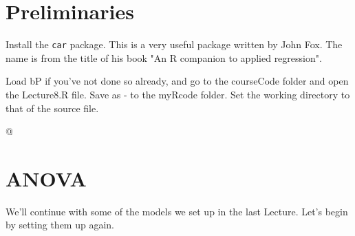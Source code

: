 \documentclass[titlepage]{book}\usepackage{knitr}
\begin{document}
\author{Brian Williams $<$\href{mailto:bjw649@gmail.com}%
{bjw649@gmail.com}$>$}


\section{Preliminaries}
Install the \texttt{car} package. This is a very useful package written by John Fox. The name is from the title of his book "An R companion to applied regression". 


Load bP if you've not done so already, and go to the courseCode folder and open the Lecture8.R file.  Save as - to the myRcode folder.  Set the working directory to that of the source file.

\begin{knitrout}
\color{fgcolor}\begin{kframe}
\begin{alltt}
\hlstd{(}\hlstd{)}
\end{alltt}
\end{kframe}
\end{knitrout}

@

\section{ANOVA}
We'll continue with some of the models we set up in the last Lecture.  Let's begin by setting them up again.

\begin{knitrout}
\color{fgcolor}\begin{kframe}
\begin{alltt}
 \hlkwb{<-} \hlopt{~}\hlopt{+} 
\end{alltt}
\end{kframe}
\end{knitrout}


\begin{knitrout}
\color{fgcolor}\begin{kframe}
\begin{alltt}
 \hlkwb{<-}  \hlopt{~}  \hlopt{+}  \hlopt{+}  \hlopt{+}  \hlopt{+}  \hlopt{+}
   \hlopt{+}  \hlopt{+}     \hlopt{==} \hlstd{)}
\end{alltt}
\end{kframe}
\end{knitrout}
\end{document}
